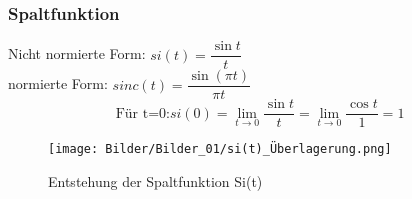 \subsubsection{\textbf{Spaltfunktion}}
Nicht normierte Form:  $si(t)=\dfrac{\sin t}{t}$\\
normierte Form:        $sinc(t)=\dfrac{\sin(\pi t)}{\pi t}$\\
\begin{equation}
    \mbox{Für t=0:}
    si(0)=\lim_{t \to 0} \dfrac{\sin t}{t}=\lim_{t \to 0}  \dfrac{\cos t}{1}=1 
\end{equation}

\begin{figure}[H]
    \centering
    \texttt{[image: Bilder/Bilder\_01/si(t)\_Überlagerung.png]}
    \caption{Entstehung der Spaltfunktion Si(t)}
    \label{fig:si(t)_Überlagerung}
\end{figure}




\begin{comment}
\begin{itemize}
    \item 
    \begin{wrapfigure}{r}{6cm}
        \centering
        \texttt{[image: Bilder/Bilder\_01/gerade\_Funktion.png]}
        \caption{Gerade Funktion}
        \label{fig:gerade}
    \end{wrapfigure}
    Eine Funktion $x(t)$ ist gerade, wenn es gilt:
    $x(t)=x(-t)$ $\Rightarrow$ achsensymmetrisch
    \item 
    \begin{wrapfigure}{r}{6cm}
        \centering
        \texttt{[image: Bilder/Bilder\_01/ungerade\_Funktion.png]}
        \caption{Ungerade Funktion}
        \label{fig:ungerade}
    \end{wrapfigure}
    Eine Funktion $x(t)$ ist ungerade, wenn es gilt:
    $x(t)=-x(-t)$ $\Rightarrow$ punktsymmetrisch
\end{itemize}
\end{comment}

